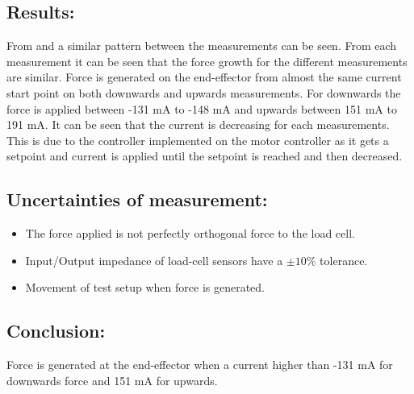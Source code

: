 \subsection*{Results:}
From  and  a similar pattern between the measurements can be seen. From each measurement it can be seen that the force growth for the different measurements are similar. Force is generated on the end-effector from almost the same current start point on both downwards and upwards measurements. For downwards the force is applied between -131 mA to -148 mA and upwards between 151 mA to 191 mA. It can be seen that the current is decreasing for each measurements. This is due to the controller implemented on the motor controller as it gets a setpoint and current is applied until the setpoint is reached and then decreased.


%
\subsection*{Uncertainties of measurement:}
\begin{itemize}
\item The force applied is not perfectly orthogonal force to the load cell.
\item Input/Output impedance of load-cell sensors have a $\pm 10 \%$ tolerance.
\item Movement of test setup when force is generated.
\end{itemize}

\subsection*{Conclusion:}
Force is generated at the end-effector when a current higher than -131 mA for downwards force and 151 mA for upwards.